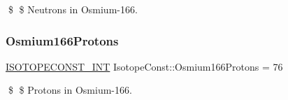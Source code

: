 \$ \$ Neutrons in Osmium-\/166. \mbox{\label{group___isotope_const-_osmium-_os166_gac212efef17f995a41214e83123e96c5d}} 
\subsubsection{\texorpdfstring{Osmium166\+Protons}{Osmium166Protons}}
{\footnotesize\ttfamily \mbox{\hyperlink{group___isotope_const-_macros_ga5f18360b3e99483a35c32d789e62621c}{I\+S\+O\+T\+O\+P\+E\+C\+O\+N\+S\+T\+\_\+\+I\+NT}} Isotope\+Const\+::\+Osmium166\+Protons = 76}

\$ \$ Protons in Osmium-\/166. 